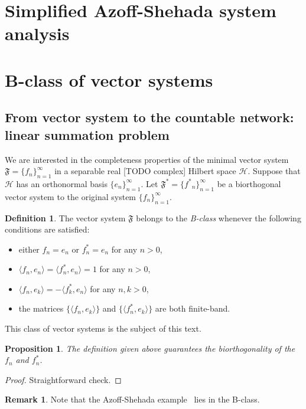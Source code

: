 \documentclass[12pt]{article}
\renewcommand{\cal}[1]{\mathcal{#1}}
\newcommand\inner[2]{\langle #1, #2 \rangle}
\newtheorem{prop}{Proposition}
\theoremstyle{definition}
\newtheorem{remark}{Remark}
\newtheorem{definition}{Definition}
\newcommand{\seq}[1]{\{{#1}_n\}_{n=1}^\infty}
\newcommand{\fsys}{\mathfrak{F}}
\newcommand{\fstarsys}{\mathfrak{F^{*}}}
\numberwithin{remark}{section}
\numberwithin{theorem}{section}
\numberwithin{prop}{section}
\numberwithin{equation}{section}
\numberwithin{lemma}{section}
\numberwithin{prop_under_lemma}{lemma}
\begin{document}


\section{Simplified Azoff-Shehada system analysis}

\section{B-class of vector systems}
  \subsection{From vector system to the countable network: linear summation problem}
    We are interested in the completeness properties of the minimal vector system $\fsys = \seq{f}$
      in a separable real [TODO complex] Hilbert space $\cal{H}$.
    Suppose that $\cal{H}$ has an orthonormal basis $\seq{e}$.
    Let $\fstarsys = \seq{f^*}$ be a biorthogonal vector system to the original system $\seq{f}$.
    \begin{definition}
        The vector system $\fsys$ belongs to the \textit{B-class} whenever the following conditions are satisfied:
        \begin{itemize}
            \item either $f_n = e_n$ or $f^*_n = e_n$ for any $n > 0$,
            \item $\inner{f_n}{e_n} = \inner{f^*_n}{e_n} = 1$ for any $n > 0$,
            \item $\inner{f_n}{e_k} = -\inner{f^*_k}{e_n}$ for any $n, k > 0$,
            \item the matrices $\{\inner{f_n}{e_k}\}$ and $\{\inner{f^*_n}{e_k}\}$ are both finite-band.
        \end{itemize}
    \end{definition}
    This class of vector systems is the subject of this text.
    \begin{prop}
        The definition given above guarantees the biorthogonality of the $f_n$ and $f^*_n$.
    \end{prop}
    \begin{proof}
        Straightforward check.
    \end{proof}
    \begin{remark}
        Note that the Azoff-Shehada example~\cite{azoff} lies in the B-class.
    \end{remark}
    
\end{document}
